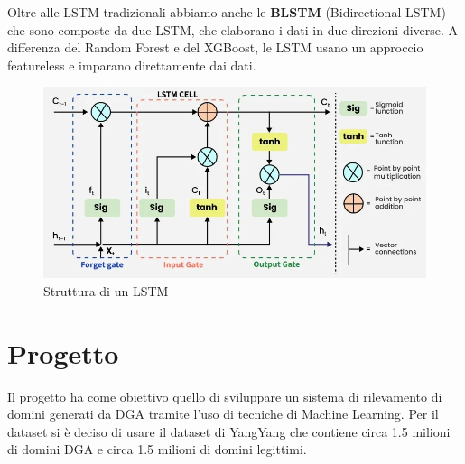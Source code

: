 \documentclass[12pt,a4paper,openright,twoside]{book}
\begin{document}
\noindent Oltre alle LSTM tradizionali abbiamo anche le \textbf{BLSTM} (Bidirectional LSTM) che sono
composte da due LSTM, che elaborano i dati in due direzioni diverse.
A differenza del Random Forest e del XGBoost, le LSTM usano un approccio featureless e imparano
direttamente dai dati.

\begin{figure}[H]
    \centering
    \includegraphics[width=.8\linewidth]{figures/gate_of_lstm.png}
    \caption{Struttura di un LSTM \cite{LSTM_image}}
    \label{fig:LSTM}
\end{figure}


\chapter{Progetto}
Il progetto ha come obiettivo quello di sviluppare un sistema
di rilevamento di domini generati da DGA tramite
l'uso di tecniche di Machine Learning. 
Per il dataset si è deciso di usare il dataset di YangYang \cite{dataset_yangyang}
che contiene circa 1.5 milioni di domini DGA e circa 1.5 milioni di domini legittimi.
\end{document}
